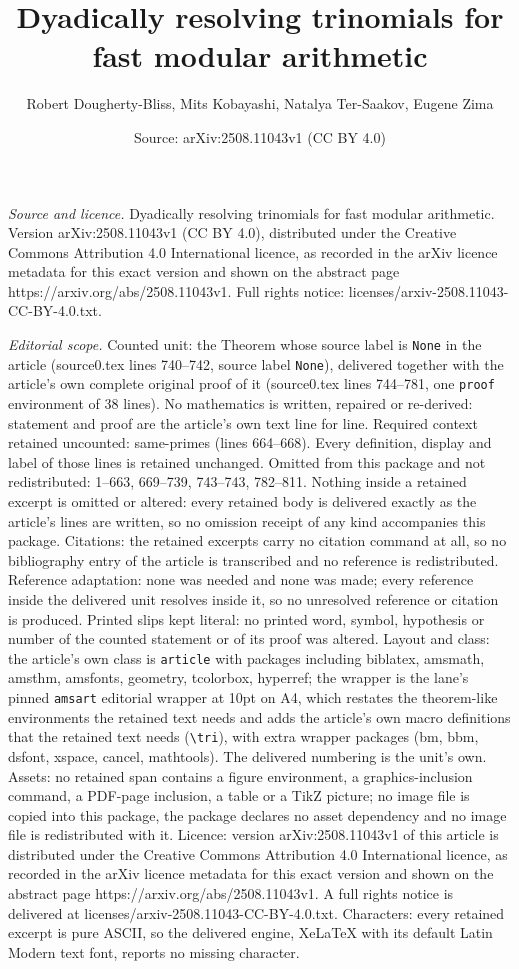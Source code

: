 \documentclass[10pt,a4paper]{amsart}
\title[Dyadically resolving trinomials for fast modular arithmetic]{Dyadically resolving trinomials for fast modular arithmetic}
\author{Robert Dougherty-Bliss, Mits Kobayashi, Natalya Ter-Saakov, Eugene Zima}
\date{Source: arXiv:2508.11043v1 (CC BY 4.0)}
\begin{document}
\maketitle

\noindent\emph{Source and licence.} Dyadically resolving trinomials for fast modular arithmetic. Version arXiv:2508.11043v1 (CC BY 4.0), distributed under the Creative Commons Attribution 4.0 International licence, as recorded in the arXiv licence metadata for this exact version and shown on the abstract page https://arxiv.org/abs/2508.11043v1. Full rights notice: licenses/arxiv-2508.11043-CC-BY-4.0.txt.\par\smallskip

\noindent\textit{Editorial scope.} Counted unit: the Theorem whose source label is \texttt{None} in the article (source0.tex lines 740--742, source label \texttt{None}), delivered together with the article's own complete original proof of it (source0.tex lines 744--781, one \texttt{proof} environment of 38 lines). No mathematics is written, repaired or re-derived: statement and proof are the article's own text line for line. Required context retained uncounted: same-primes (lines 664--668). Every definition, display and label of those lines is retained unchanged. Omitted from this package and not redistributed: 1--663, 669--739, 743--743, 782--811. Nothing inside a retained excerpt is omitted or altered: every retained body is delivered exactly as the article's lines are written, so no omission receipt of any kind accompanies this package. Citations: the retained excerpts carry no citation command at all, so no bibliography entry of the article is transcribed and no reference is redistributed. Reference adaptation: none was needed and none was made; every reference inside the delivered unit resolves inside it, so no unresolved reference or citation is produced. Printed slips kept literal: no printed word, symbol, hypothesis or number of the counted statement or of its proof was altered. Layout and class: the article's own class is \texttt{article} with packages including biblatex, amsmath, amsthm, amsfonts, geometry, tcolorbox, hyperref; the wrapper is the lane's pinned \texttt{amsart} editorial wrapper at 10pt on A4, which restates the theorem-like environments the retained text needs and adds the article's own macro definitions that the retained text needs (\texttt{\textbackslash tri}), with extra wrapper packages (bm, bbm, dsfont, xspace, cancel, mathtools). The delivered numbering is the unit's own. Assets: no retained span contains a figure environment, a graphics-inclusion command, a PDF-page inclusion, a table or a TikZ picture; no image file is copied into this package, the package declares no asset dependency and no image file is redistributed with it. Licence: version arXiv:2508.11043v1 of this article is distributed under the Creative Commons Attribution 4.0 International licence, as recorded in the arXiv licence metadata for this exact version and shown on the abstract page https://arxiv.org/abs/2508.11043v1. A full rights notice is delivered at licenses/arxiv-2508.11043-CC-BY-4.0.txt. Characters: every retained excerpt is pure ASCII, so the delivered engine, XeLaTeX with its default Latin Modern text font, reports no missing character.
\end{document}
